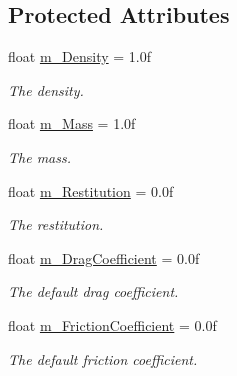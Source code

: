 \subsection*{Protected Attributes}
\begin{DoxyCompactItemize}
\item 
\mbox{\label{class_dynamic_object_ae418fa977f4547419cda31827c266ae8}} 
float \hyperlink{class_dynamic_object_ae418fa977f4547419cda31827c266ae8}{m\+\_\+\+Density} = 1.\+0f
\begin{DoxyCompactList}\small\item\em The density. \end{DoxyCompactList}\item 
\mbox{\label{class_dynamic_object_aab95811a0f06dd425a6ecd2a20153083}} 
float \hyperlink{class_dynamic_object_aab95811a0f06dd425a6ecd2a20153083}{m\+\_\+\+Mass} = 1.\+0f
\begin{DoxyCompactList}\small\item\em The mass. \end{DoxyCompactList}\item 
\mbox{\label{class_dynamic_object_ac1fa799a751f1f2b0dd9996f9c2f4c4d}} 
float \hyperlink{class_dynamic_object_ac1fa799a751f1f2b0dd9996f9c2f4c4d}{m\+\_\+\+Restitution} = 0.\+0f
\begin{DoxyCompactList}\small\item\em The restitution. \end{DoxyCompactList}\item 
\mbox{\label{class_dynamic_object_a7721debe06365b091f533b9f1641c2b2}} 
float \hyperlink{class_dynamic_object_a7721debe06365b091f533b9f1641c2b2}{m\+\_\+\+Drag\+Coefficient} = 0.\+0f
\begin{DoxyCompactList}\small\item\em The default drag coefficient. \end{DoxyCompactList}\item 
\mbox{\label{class_dynamic_object_aeff80849df69f067cba4b67b8d64019b}} 
float \hyperlink{class_dynamic_object_aeff80849df69f067cba4b67b8d64019b}{m\+\_\+\+Friction\+Coefficient} = 0.\+0f
\begin{DoxyCompactList}\small\item\em The default friction coefficient. \end{DoxyCompactList}\item 

\end{DoxyCompactItemize}
